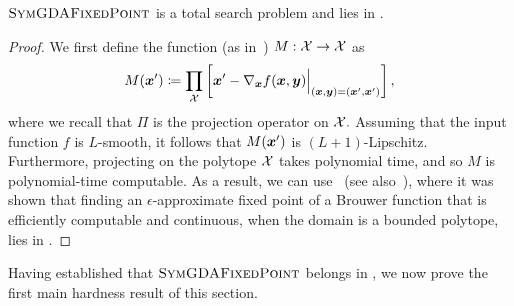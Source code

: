 \begin{lemma}\label{lem:membership}
  $\textsc{SymGDAFixedPoint}$ is a total
search problem and lies in \PPAD.
  \end{lemma}
\begin{proof}  
We first define the function (as in~) $M: \mathcal{X} \to \mathcal{X}$ as
\begin{equation*}
M({\bm{x}}') \coloneqq \prod_{\mathcal{X}} \left[{\bm{x}}' - \nabla _{{\bm{x}}}  f({\bm{x}},{\bm{y}})\Big|_{({\bm{x}},{\bm{y}})=({\bm{x}}',{\bm{x}}')} \right],
\end{equation*}
where we recall that $\Pi$ is the projection operator on $\mathcal{X}.$ Assuming that the input function $f$ is $L$-smooth, it follows that $M({\bm{x}}')$ is $(L+1)$-Lipschitz. Furthermore, projecting on the polytope $\mathcal{X}$ takes polynomial time, and so $M$ is polynomial-time computable. As a result, we can use~\citet[Proposition 2, part 2]{Etessami10:On} (see also~\citet[Proposition D.1]{Fearnley23:Complexity}), where it was shown that finding an $\epsilon$-approximate fixed point of a Brouwer function that is efficiently computable and continuous, when the domain is a bounded polytope, lies in \PPAD.
\end{proof}

Having established that $\textsc{SymGDAFixedPoint}$ belongs in \PPAD, we now prove the first main hardness result of this section.

